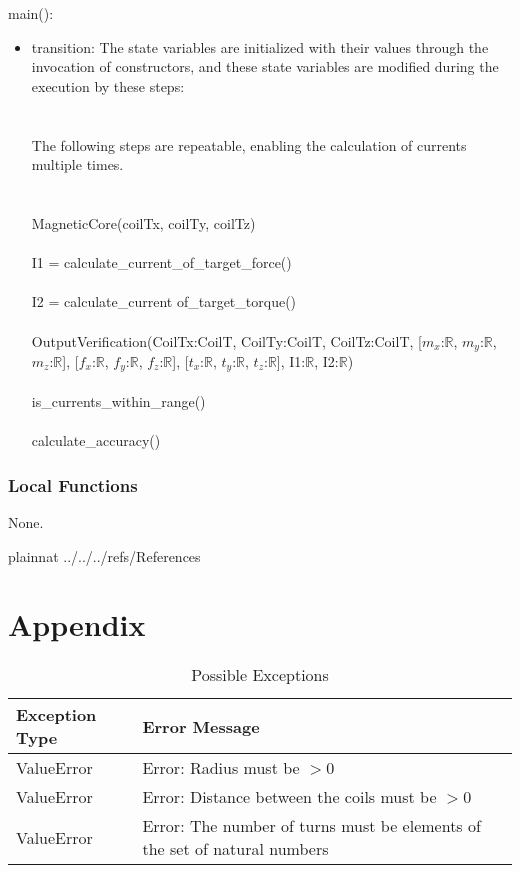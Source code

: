 \documentclass[12pt, titlepage]{article}
\begin{document}
\noindent main():
\begin{itemize}
\item transition: The state variables are initialized with their values through the invocation of constructors, and these state variables are modified during the execution by these steps:\\

\\
\\
The following steps are repeatable, enabling the calculation of currents multiple times.\\
\\
\\

MagneticCore(coilTx, coilTy, coilTz)\\
\\
I1 = calculate\_current\_of\_target\_force()\\
\\
I2 = calculate\_current of\_target\_torque()\\
\\
OutputVerification(CoilTx:CoilT,  CoilTy:CoilT,  CoilTz:CoilT, [$m_x$:$\mathbb{R}$, $m_y$:$\mathbb{R}$, $m_z$:$\mathbb{R}$], [$f_x$:$\mathbb{R}$, $f_y$:$\mathbb{R}$, $f_z$:$\mathbb{R}$], [$t_x$:$\mathbb{R}$, $t_y$:$\mathbb{R}$, $t_z$:$\mathbb{R}$], I1:$\mathbb{R}$, I2:$\mathbb{R}$)\\
\\
is\_currents\_within\_range()\\
\\
calculate\_accuracy()\\

\end{itemize}

\subsubsection{Local Functions}
None.
\newpage

 {plainnat}
 {../../../refs/References}

\newpage

\section{Appendix} \label{Appendix}


\begin{longtable}{l p{12cm}}
\caption{Possible Exceptions} \\
\toprule
\textbf{Exception Type} & \textbf{Error Message} \\
\midrule
ValueError & Error: Radius must be $> 0$ \\
ValueError & Error: Distance between the coils must be $> 0$ \\
ValueError & Error: The number of turns must be elements of the set of natural numbers\\
\bottomrule
\end{longtable}
\end{document}
